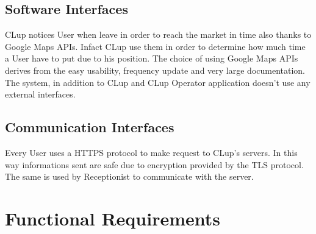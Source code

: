\subsection{Software Interfaces}
CLup notices User when leave in order to reach the market in time also thanks to Google Maps APIs. Infact CLup use them in order to determine how much time a User have to put due to his position.
The choice of using Google Maps APIs derives from the easy usability, frequency update and very large documentation.
The system, in addition to CLup and CLup Operator application doesn't use any external interfaces.


\subsection{Communication Interfaces}
Every User uses a HTTPS protocol to make request to CLup's servers. In this way informations sent are safe due to encryption provided by the TLS protocol. The same is used by Receptionist to communicate with the server.
\section{Functional Requirements}





